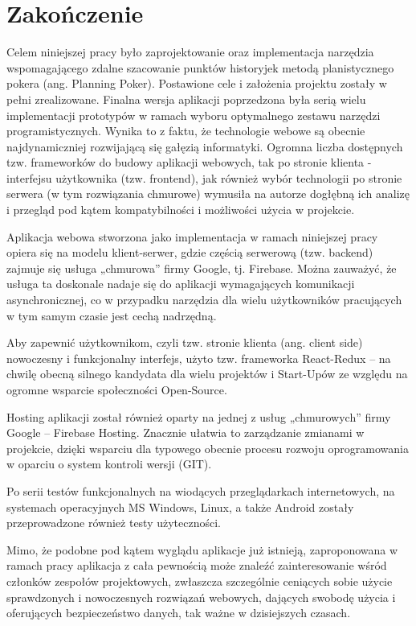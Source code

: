 ﻿\chapter*{Zakończenie}

Celem niniejszej pracy było zaprojektowanie oraz implementacja narzędzia wspomagającego zdalne szacowanie punktów historyjek metodą planistycznego pokera (ang. Planning Poker).
Postawione cele i założenia projektu zostały w pełni zrealizowane.
Finalna wersja aplikacji poprzedzona była serią wielu implementacji prototypów w ramach wyboru optymalnego zestawu narzędzi programistycznych.
Wynika to z faktu, że technologie webowe są obecnie najdynamiczniej rozwijającą się gałęzią informatyki.
Ogromna liczba dostępnych tzw. frameworków do budowy aplikacji webowych, tak po stronie klienta - interfejsu użytkownika (tzw. frontend),
jak również wybór technologii po stronie serwera (w tym rozwiązania chmurowe)
wymusiła na autorze dogłębną ich analizę i przegląd pod kątem kompatybilności i możliwości użycia w projekcie.


Aplikacja webowa stworzona jako implementacja w ramach niniejszej pracy opiera się na modelu klient-serwer,
gdzie częścią serwerową (tzw. backend) zajmuje się usługa „chmurowa” firmy Google, tj. Firebase. Można zauważyć,
że usługa ta doskonale nadaje się do aplikacji wymagających komunikacji asynchronicznej,
co w przypadku narzędzia dla wielu użytkowników pracujących w tym samym czasie jest cechą nadrzędną.

Aby zapewnić użytkownikom, czyli tzw. stronie klienta (ang. client side) nowoczesny i funkcjonalny interfejs,
użyto tzw. frameworka React-Redux – na chwilę obecną silnego kandydata dla wielu projektów i Start-Upów ze względu na ogromne wsparcie społeczności Open-Source.

Hosting aplikacji został również oparty na jednej z usług „chmurowych” firmy Google – Firebase Hosting.
Znacznie ułatwia to zarządzanie zmianami w projekcie, dzięki wsparciu dla typowego obecnie procesu rozwoju oprogramowania w oparciu o system kontroli wersji (GIT).

Po serii testów funkcjonalnych na wiodących przeglądarkach internetowych, na systemach operacyjnych MS Windows,
Linux, a także Android zostały przeprowadzone również testy użyteczności.

Mimo, że podobne pod kątem wyglądu aplikacje już istnieją,
zaproponowana w ramach pracy aplikacja z cała pewnością może znaleźć zainteresowanie wśród członków zespołów projektowych,
zwłaszcza szczególnie ceniących sobie użycie sprawdzonych i nowoczesnych rozwiązań webowych,
dających swobodę użycia i oferujących bezpieczeństwo danych, tak ważne w dzisiejszych czasach.

